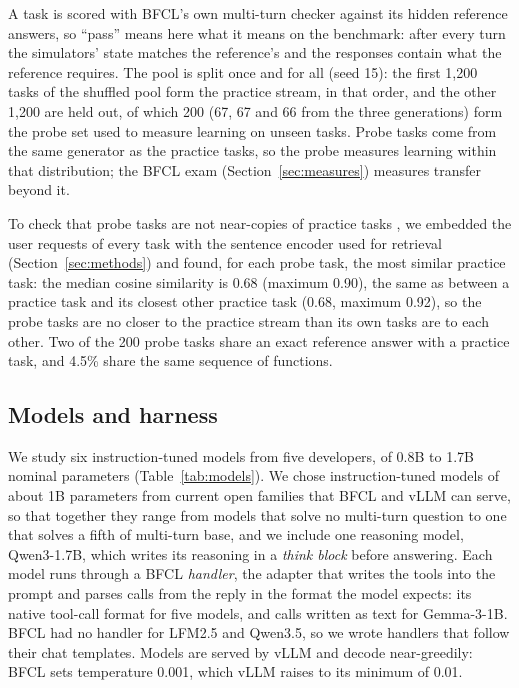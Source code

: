 \documentclass[a4paper,fleqn]{cas-dc}
\begin{document}
A task is scored with BFCL's own multi-turn checker against its hidden reference answers, so ``pass'' means here what it
means on the benchmark: after every turn the simulators' state matches the reference's and the responses contain what
the reference requires. The pool is split once and for all (seed 15): the first 1,200 tasks of the shuffled pool form the practice
stream, in that order, and the other 1,200 are held out, of which 200 (67, 67 and 66 from the three generations) form
the probe set used to measure learning on unseen tasks. Probe tasks come from the same generator as the practice tasks,
so the probe measures learning within that distribution; the BFCL exam (Section~\ref{sec:measures}) measures transfer
beyond it.

To check that probe tasks are not near-copies of practice tasks \citep{golchin2024time}, we embedded the user requests of
every task with the sentence encoder used for retrieval (Section~\ref{sec:methods}) and found, for each probe task, the
most similar practice task: the median cosine similarity is 0.68 (maximum 0.90), the same as between a practice task
and its closest other practice task (0.68, maximum 0.92), so the probe tasks are no closer to the practice stream than
its own tasks are to each other. Two of the 200 probe tasks share an
exact reference answer with a practice task, and 4.5\% share the same sequence of functions.

\subsection{Models and harness}\label{sec:models}
We study six instruction-tuned models from five developers, of 0.8B to 1.7B nominal parameters
(Table~\ref{tab:models}). We chose instruction-tuned models of about 1B parameters from current open families that BFCL and vLLM can
serve, so that together they range from models that solve no multi-turn question to one that solves a fifth of
multi-turn base, and
we include one reasoning model, Qwen3-1.7B, which writes its reasoning in a \emph{think block} before answering. Each
model runs through a BFCL \emph{handler}, the adapter that writes the tools into the prompt and parses calls from the
reply in the format the model expects: its native tool-call format for five models, and calls written as text for Gemma-3-1B. BFCL had no handler for LFM2.5 and Qwen3.5, so we wrote handlers that follow their chat templates. Models are
served by vLLM \citep{kwon2023efficient} and decode near-greedily: BFCL sets temperature 0.001, which vLLM raises to its
minimum of 0.01.
\end{document}
